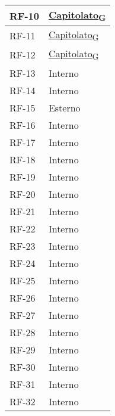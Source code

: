 \begin{longtable}{|>{\centering\arraybackslash}m{}|>{\centering\arraybackslash}m{}|}
	RF-10              & \href{https://7last.github.io/docs/rtb/documentazione-interna/glossario\#capitolato}{Capitolato\textsubscript{G}}                     \\\hline
	RF-11              & \href{https://7last.github.io/docs/rtb/documentazione-interna/glossario\#capitolato}{Capitolato\textsubscript{G}}                     \\\hline
	RF-12              & \href{https://7last.github.io/docs/rtb/documentazione-interna/glossario\#capitolato}{Capitolato\textsubscript{G}}                     \\\hline
	RF-13              & Interno                        \\\hline
	RF-14              & Interno                        \\\hline
	RF-15              & Esterno                        \\\hline
	RF-16              & Interno                        \\\hline
	RF-17              & Interno                        \\\hline
	RF-18              & Interno                        \\\hline
	RF-19              & Interno                        \\\hline
	RF-20              & Interno                        \\\hline
	RF-21              & Interno                        \\\hline
	RF-22              & Interno                        \\\hline
	RF-23              & Interno                        \\\hline
	RF-24              & Interno                        \\\hline
	RF-25              & Interno                        \\\hline
	RF-26              & Interno                        \\\hline
	RF-27              & Interno                        \\\hline
	RF-28              & Interno                        \\\hline
	RF-29              & Interno                        \\\hline
	RF-30              & Interno                        \\\hline
	RF-31              & Interno                        \\\hline
	RF-32              & Interno                        \\\hline

\end{longtable}
